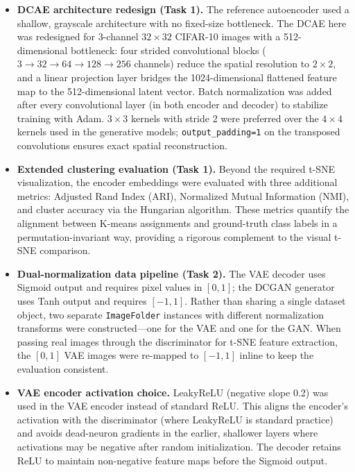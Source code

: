 \documentclass[12pt]{article}
\begin{document}
\begin{itemize}
    \item \textbf{DCAE architecture redesign (Task 1).}
    The reference autoencoder used a shallow, grayscale architecture with no fixed-size bottleneck.
    The DCAE here was redesigned for 3-channel $32\times32$ CIFAR-10 images with a 512-dimensional bottleneck: four strided convolutional blocks ($3\to32\to64\to128\to256$ channels) reduce the spatial resolution to $2\times2$, and a linear projection layer bridges the 1024-dimensional flattened feature map to the 512-dimensional latent vector.
    Batch normalization was added after every convolutional layer (in both encoder and decoder) to stabilize training with Adam.
    $3\times3$ kernels with stride 2 were preferred over the $4\times4$ kernels used in the generative models; \texttt{output\_padding=1} on the transposed convolutions ensures exact spatial reconstruction.

    \item \textbf{Extended clustering evaluation (Task 1).}
    Beyond the required t-SNE visualization, the encoder embeddings were evaluated with three additional metrics: Adjusted Rand Index (ARI), Normalized Mutual Information (NMI), and cluster accuracy via the Hungarian algorithm.
    These metrics quantify the alignment between K-means assignments and ground-truth class labels in a permutation-invariant way, providing a rigorous complement to the visual t-SNE comparison.

    \item \textbf{Dual-normalization data pipeline (Task 2).}
    The VAE decoder uses Sigmoid output and requires pixel values in $[0,1]$; the DCGAN generator uses Tanh output and requires $[-1,1]$.
    Rather than sharing a single dataset object, two separate \texttt{ImageFolder} instances with different normalization transforms were constructed—one for the VAE and one for the GAN.
    When passing real images through the discriminator for t-SNE feature extraction, the $[0,1]$ VAE images were re-mapped to $[-1,1]$ inline to keep the evaluation consistent.

    \item \textbf{VAE encoder activation choice.}
    LeakyReLU (negative slope 0.2) was used in the VAE encoder instead of standard ReLU.
    This aligns the encoder's activation with the discriminator (where LeakyReLU is standard practice) and avoids dead-neuron gradients in the earlier, shallower layers where activations may be negative after random initialization.
    The decoder retains ReLU to maintain non-negative feature maps before the Sigmoid output.


\end{itemize}
\end{document}
